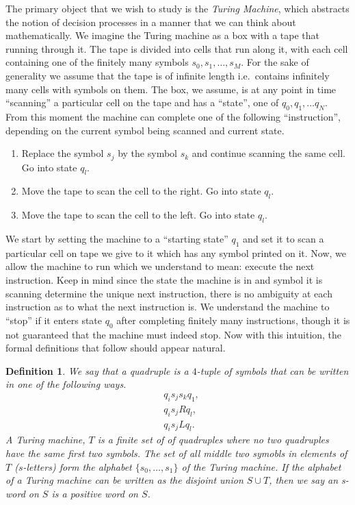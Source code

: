 \documentclass[12pt]{article}
\newtheorem{definition}{Definition}
\theoremstyle{definition}
\numberwithin{equation}{theorem}
\begin{document}
The primary object that we wish to study is the \emph{Turing Machine}, which abstracts the notion of decision processes in a manner that we can think about mathematically. We imagine the Turing machine as a box with a tape that running through it. The tape is divided into cells that run along it, with each cell containing one of the finitely many symbols $s_0,s_1,\dots,s_M$. For the sake of generality we assume that the tape is of infinite length i.e.\ contains infinitely many cells with symbols on them. The box, we assume, is at any point in time ``scanning'' a particular cell on the tape and has a ``state'', one of $q_0,q_1,\dots q_N$. From this moment the machine can complete one of the following ``instruction'', depending on the current symbol being scanned and current state.
\begin{enumerate}
\item Replace the symbol $s_j$ by the symbol $s_k$ and continue scanning the same cell. Go into state $q_l$.
\item Move the tape to scan the cell to the right. Go into state $q_l$.
\item Move the tape to scan the cell to the left. Go into state $q_l$.
\end{enumerate}
We start by setting the machine to a ``starting state'' $q_1$ and set it to  scan a particular cell on tape we give to it which has any symbol printed on it. Now, we allow the machine to run which we understand to mean: execute the next instruction. Keep in mind since the state the machine is in and symbol it is scanning determine the unique next instruction, there is no ambiguity at each instruction as to what the next instruction is. We understand the machine to ``stop'' if it enters state $q_0$ after completing finitely many instructions, though it is not guaranteed that the machine must indeed stop. Now with this intuition, the formal definitions that follow should appear natural.

\begin{definition}
  We say that a \emph{quadruple} is a $4$-tuple of symbols that can be written in one of the following ways.
  \begin{align*}
    & q_is_js_kq_1, \\
    & q_is_jRq_l, \\
    & q_is_jLq_l.
  \end{align*}
  A \emph{Turing machine}, $T$ is a finite set of of quadruples where no two quadruples have the same first two symbols. The set of all middle two symobls in elements of $T$ ($s$-letters) form the \emph{alphabet} $\{s_0, \dots, s_1\}$ of the Turing machine. If the alphabet of a Turing machine can be written as the disjoint union $S \cup T$, then we say an \emph{s-word} on $S$ is a positive word on $S$.
\end{definition}
\end{document}
